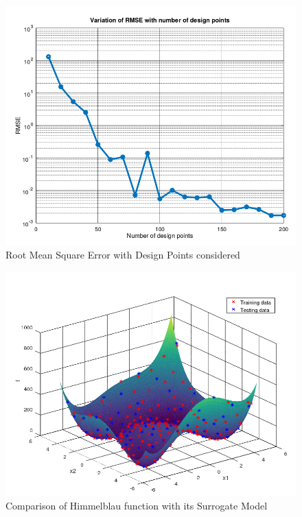 \begin{figure}[H]
	\includegraphics[width=\textwidth]{optimization/RMSE_analysis.png}
	\caption{Root Mean Square Error with Design Points considered}
	\label{fig:Root Mean Square Error with Design Points considered} %
\end{figure}


\begin{figure}[H]
	\includegraphics[width=\textwidth]{optimization/Himmel_blau_fcn.png}
	\caption{Comparison of Himmelblau function with its Surrogate Model}
	\label{fig:Comparison of Himmelblau function with its Surrogate Model} %
\end{figure}

